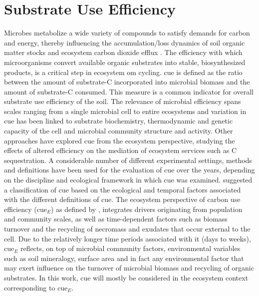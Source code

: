 \section{Substrate Use Efficiency }
	Microbes metabolize a wide variety of compounds to satisfy demands for \gls{carbon} and energy, thereby influencing the accumulation/loss dynamics of soil organic matter stocks and ecosystem carbon dioxide efflux \citep{xu2017}. The efficiency with which microorganisms convert available organic substrates into stable, biosynthesized products, is a critical step in ecosystem \gls{om} cycling. \gls{cue} is defined as the ratio between the amount of substrate-C incorporated into microbial biomass and the amount of substrate-C consumed. This measure is a common indicator for overall substrate use efficiency of the soil. The relevance of microbial efficiency spans scales ranging from a single microbial cell to entire ecosystems and variation in \gls{cue} has been linked to substrate biochemistry, thermodynamic and genetic capacity of the cell and microbial community structure and activity\citep{kallenbach2019, soares2019}. Other approaches have explored \gls{cue} from the ecosystem perspective, studying the effects of altered efficiency on the mediation of ecosystem services such as C sequestration. A considerable number of different experimental settings, methods and definitions have been used for the evaluation of \gls{cue} over the years, depending on the discipline and ecological framework in which \gls{cue} was examined. \citet{geyer2016} suggested a classification of \gls{cue} based on the ecological and temporal factors associated with the different definitions of \gls{cue}. The ecosystem perspective of carbon use efficiency (\gls{cue}$ _E $) as defined by \citet{geyer2016}, integrates drivers originating from population and community scales, as well as time-dependent factors such as biomass turnover and the recycling of necromass and exudates that occur external to the cell. Due to the relatively longer time periods associated with it (days to weeks), \gls{cue}$ _E $ reflects, on top of microbial community factors, environmental variables such as soil mineralogy, surface area and in fact any environmental factor that may exert influence on the turnover of microbial biomass and recycling of organic substrates. In this work, \gls{cue} will mostly be considered in the ecosystem context corresponding to \gls{cue}$ _E $.\\
